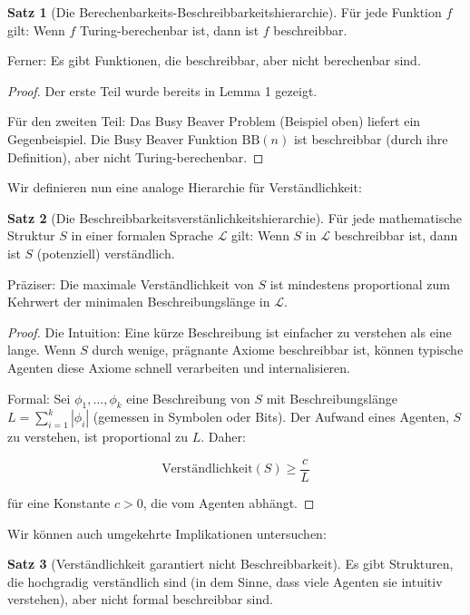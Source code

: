 \documentclass[a4paper,12pt]{article}
\theoremstyle{definition}
\newtheorem{satz}{Satz}
\begin{document}
\begin{satz}[Die Berechenbarkeits-Beschreibbarkeitshierarchie]
Für jede Funktion $f$ gilt: Wenn $f$ Turing-berechenbar ist, dann ist $f$ beschreibbar.

Ferner: Es gibt Funktionen, die beschreibbar, aber nicht berechenbar sind.
\end{satz}

\begin{proof}
Der erste Teil wurde bereits in Lemma 1 gezeigt.

Für den zweiten Teil: Das Busy Beaver Problem (Beispiel oben) liefert ein Gegenbeispiel. Die Busy Beaver Funktion $\text{BB}(n)$ ist beschreibbar (durch ihre Definition), aber nicht Turing-berechenbar.
\end{proof}

Wir definieren nun eine analoge Hierarchie für Verständlichkeit:

\begin{satz}[Die Beschreibbarkeitsverstänlichkeitshierarchie]
Für jede mathematische Struktur $S$ in einer formalen Sprache $\mathcal{L}$ gilt: Wenn $S$ in $\mathcal{L}$ beschreibbar ist, dann ist $S$ (potenziell) verständlich.

Präziser: Die maximale Verständlichkeit von $S$ ist mindestens proportional zum Kehrwert der minimalen Beschreibungslänge in $\mathcal{L}$.
\end{satz}

\begin{proof}
Die Intuition: Eine kürze Beschreibung ist einfacher zu verstehen als eine lange. Wenn $S$ durch wenige, prägnante Axiome beschreibbar ist, können typische Agenten diese Axiome schnell verarbeiten und internalisieren.

Formal: Sei $\phi_1, \ldots, \phi_k$ eine Beschreibung von $S$ mit Beschreibungslänge $L = \sum_{i=1}^k |\phi_i|$ (gemessen in Symbolen oder Bits). Der Aufwand eines Agenten, $S$ zu verstehen, ist proportional zu $L$. Daher:

$$\text{Verständlichkeit}(S) \geq \frac{c}{L}$$

für eine Konstante $c > 0$, die vom Agenten abhängt.
\end{proof}

Wir können auch umgekehrte Implikationen untersuchen:

\begin{satz}[Verständlichkeit garantiert nicht Beschreibbarkeit]
Es gibt Strukturen, die hochgradig verständlich sind (in dem Sinne, dass viele Agenten sie intuitiv verstehen), aber nicht formal beschreibbar sind.
\end{satz}
\end{document}
